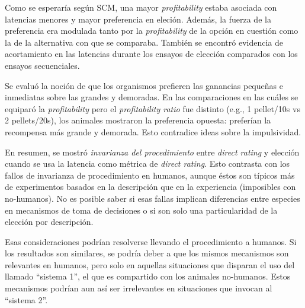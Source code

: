 \documentclass[a4paper,12pt]{article}
\begin{document}
Como se esperaría según SCM, una mayor {\slshape profitability} estaba asociada con latencias menores y mayor preferencia en eleción. Además, la fuerza de la preferencia era modulada tanto por la {\slshape profitability} de la opción en cuestión como la de la alternativa con que se comparaba. También se encontró evidencia de acortamiento en las latencias durante los ensayos de elección comparados con los ensayos secuenciales.

Se evaluó la noción de que los organismos prefieren las ganancias pequeñas e inmediatas sobre las grandes y demoradas. En las comparaciones en las cuáles se equiparó la {\slshape profitability} pero el {\slshape profitability ratio} fue distinto (e.g., 1 pellet/10s vs 2 pellets/20s), los animales mostraron la preferencia opuesta: preferían la recompensa más grande y demorada. Esto contradice ideas sobre la impulsividad.

En resumen, se mostró {\slshape invarianza del procedimiento} entre {\slshape direct rating} y elección cuando se usa la latencia como métrica de {\slshape direct rating}. Esto contrasta con los fallos de invarianza de procedimiento en humanos, aunque éstos son típicos más de experimentos basados en la descripción que en la experiencia (imposibles con no-humanos). No es posible saber si esas fallas implican diferencias entre especies en mecanismos de toma de decisiones o si son solo una particularidad de la elección por descripción.

Esas consideraciones podrían resolverse llevando el procedimiento a humanos. Si los resultados son similares, se podría deber a que los mismos mecanismos son relevantes en humanos, pero solo en aquellas situaciones que disparan el uso del llamado ``sistema 1'', el que es compartido con los animales no-humanos. Estos mecanismos podrían aun así ser irrelevantes en situaciones que invocan al ``sistema 2''.
\end{document}
